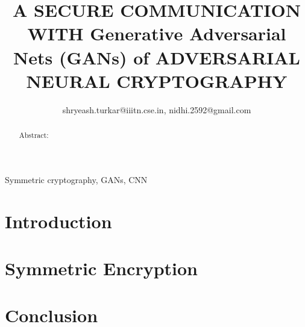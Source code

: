 \documentclass[journal,transmag]{IEEEtran}
\begin{document}
	
	\title{A SECURE COMMUNICATION WITH Generative Adversarial Nets (GANs) of ADVERSARIAL NEURAL CRYPTOGRAPHY}
	
	
	\author{
	
		
		shryeash.turkar@iiitn.cse.in, nidhi.2592@gmail.com
		
	}
	
	\maketitle

	\begin{abstract}
		Abstract: 
	\end{abstract}

    \begin{IEEEkeywords}
    	Symmetric cryptography, GANs, CNN
    \end{IEEEkeywords}
    
    
    
	
	\section{Introduction}
	

	\section{Symmetric Encryption}
	
    
    

    
    
    
    
    	
    
    
    \section {Conclusion}
	
  
  
  
	\begin{thebibliography}{00}
		
	\end{thebibliography}
\end{document}
